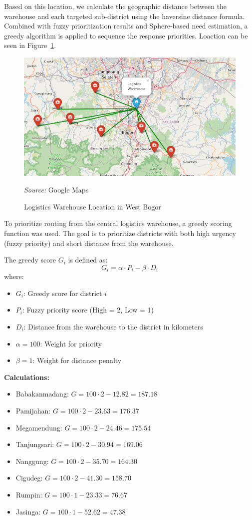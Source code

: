 \documentclass[journal,final,a4paper,twoside,11pt]{IEEEtran}
\begin{document}
Based on this location, we calculate the geographic distance between the warehouse and each targeted sub-district using the haversine distance formula. Combined with fuzzy prioritization results and Sphere-based need estimation, a greedy algorithm is applied to sequence the response priorities.
Loaction can be seen in Figure~\ref{fig:warehouse_location}.
\begin{figure}[H]
    \centerline{\includegraphics[width=0.8\linewidth]{fig6.png}}
    \caption{Logistics Warehouse Location in West Bogor}
    \label{fig:warehouse_location}
    \footnotesize{\textit{Source:} Google Maps}
\end{figure}

To prioritize routing from the central logistics warehouse, a greedy scoring function was used. The goal is to prioritize districts with both high urgency (fuzzy priority) and short distance from the warehouse.

The greedy score \( G_i \) is defined as:
\begin{equation}
G_i = \alpha \cdot P_i - \beta \cdot D_i
\end{equation}
where:
\begin{itemize}
    \item \( G_i \): Greedy score for district \( i \)
    \item \( P_i \): Fuzzy priority score (High = 2, Low = 1)
    \item \( D_i \): Distance from the warehouse to the district in kilometers
    \item \( \alpha = 100 \): Weight for priority
    \item \( \beta = 1 \): Weight for distance penalty
\end{itemize}

\noindent \textbf{Calculations:}
\begin{itemize}
    \item Babakanmadang: \( G = 100 \cdot 2 - 12.82 = 187.18 \)
    \item Pamijahan: \( G = 100 \cdot 2 - 23.63 = 176.37 \)
    \item Megamendung: \( G = 100 \cdot 2 - 24.46 = 175.54 \)
    \item Tanjungsari: \( G = 100 \cdot 2 - 30.94 = 169.06 \)
    \item Nanggung: \( G = 100 \cdot 2 - 35.70 = 164.30 \)
    \item Cigudeg: \( G = 100 \cdot 2 - 41.30 = 158.70 \)
    \item Rumpin: \( G = 100 \cdot 1 - 23.33 = 76.67 \)
    \item Jasinga: \( G = 100 \cdot 1 - 52.62 = 47.38 \)
\end{itemize} 
\end{document}
